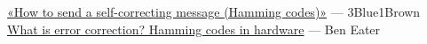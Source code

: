 \documentclass[12pt,onecolumn]{article}
\begin{document}
\begin{thebibliography}{2}
\href{https://www.youtube.com/watch?v=X8jsijhllIA}{«How to send a self-correcting message (Hamming codes)»} --- 3Blue1Brown
\href{https://www.youtube.com/watch?v=h0jloehRKas&t=0s}{What is error correction? Hamming codes in hardware} --- Ben Eater
\end{thebibliography}
\end{document}
